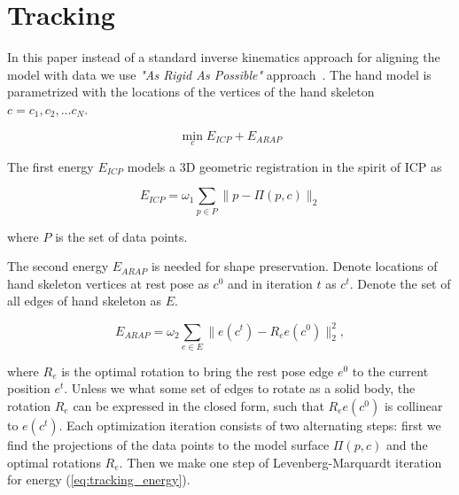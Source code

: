 \section{Tracking}

In this paper instead of a standard inverse kinematics approach for aligning the model with data we use \textit{"As Rigid As Possible"} approach~\cite{sorkine2007arap}. The hand model is parametrized with the locations of the vertices of the hand skeleton $c = {c_1, c_2, ... c_N}$.

\begin{equation}
	\min_{c} E_{ICP} + E_{ARAP} \label{eq:tracking_energy}
\end{equation}

The first energy $E_{ICP}$ models a 3D geometric registration in the spirit of ICP as

\begin{equation}
	E_{ICP} = \omega_1 \sum_{p \in P} \| p - \Pi(p, c)\|_2
\end{equation}

where $P$ is the set of data points.

The second energy $E_{ARAP}$ is needed for shape preservation. Denote locations of hand skeleton vertices at rest pose as $c^0$ and in iteration $t$ as $c^t$. Denote the set of all edges of hand skeleton as $E$.

\begin{equation}
	E_{ARAP} = \omega_2 \sum_{e \in E} \| e(c^t) - R_e e(c^0)\|_2^2,
\end{equation}

where $R_e$ is the optimal rotation to bring the rest pose edge $e^0$ to the current position $e^t$. Unless we what some set of edges to rotate as a solid body, the rotation $R_e$ can be expressed in the closed form, such that $R_e e(c^0)$ is collinear to $e(c^t)$. 
Each optimization iteration consists of two alternating steps: first we find the projections of the data points to the model surface $\Pi(p, c)$ and the optimal rotations $  R_e  $. Then we make one step of Levenberg-Marquardt iteration for energy (\ref{eq:tracking_energy}).

